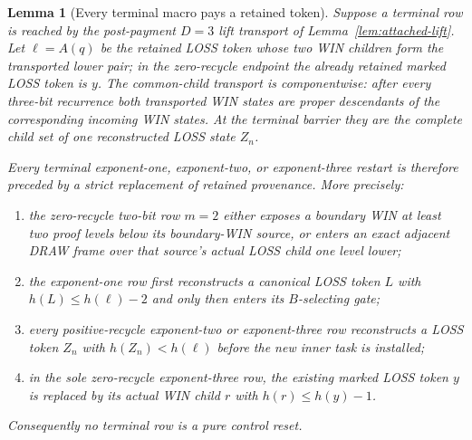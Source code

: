 \documentclass[11pt]{article}
\newtheorem{lemma}[theorem]{Lemma}
\begin{document}
\begin{lemma}[Every terminal macro pays a retained token]
\label{lem:terminal-pay}
Suppose a terminal row is reached by the post-payment $D=3$ lift transport of
Lemma~\ref{lem:attached-lift}.  Let $\ell=A(q)$ be the retained LOSS token
whose two WIN children form the transported lower pair; in the zero-recycle
endpoint the already retained marked LOSS token is $y$.  The common-child transport is componentwise: after every
three-bit recurrence both transported WIN states are proper descendants of
the corresponding incoming WIN states.  At the terminal barrier they are
the complete child set of one reconstructed LOSS state $Z_n$.

Every terminal exponent-one, exponent-two, or exponent-three restart is
therefore preceded by a strict replacement of retained provenance.  More
precisely:
\begin{enumerate}[label=(\alph*)]
\item the zero-recycle two-bit row $m=2$ either exposes a boundary WIN at
      least two proof levels below its boundary-WIN source, or enters an exact
      adjacent DRAW frame over that source's actual LOSS child one level
      lower;
\item the exponent-one row first reconstructs a canonical LOSS token $L$
      with $h(L)\le h(\ell)-2$ and only then enters its $B$-selecting gate;
\item every positive-recycle exponent-two or exponent-three row reconstructs
      a LOSS token $Z_n$ with $h(Z_n)<h(\ell)$ before the new inner task is
      installed;
\item in the sole zero-recycle exponent-three row, the existing marked LOSS
      token $y$ is replaced by its actual WIN child $r$ with
      $h(r)\le h(y)-1$.
\end{enumerate}
Consequently no terminal row is a pure control reset.
\end{lemma}
\end{document}
